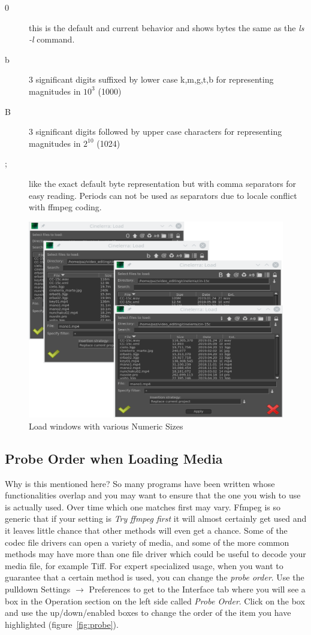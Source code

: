 \begin{description}
    \item[0] this is the default and current behavior and shows bytes the same as the \textit{ls -l} command.
    \item[b] 3 significant digits suffixed by lower case k,m,g,t,b for representing magnitudes in $10^3$ (1000)
    \item[B] 3 significant digits followed by upper case characters for representing magnitudes in $2^{10}$ (1024)
    \item[;] like the exact default byte representation but with comma separators for easy reading.  Periods can
    not be used as separators due to locale conflict with ffmpeg coding.
\end{description}

\begin{figure}[htpb]
    \centering
    \includegraphics[width=0.9\linewidth]{images/load-size.png}
    \caption{Load windows with various Numeric Sizes}
    \label{fig:load-size}
\end{figure}

\subsection{Probe Order when Loading Media}%
\label{sub:probe_order_loading_media}

Why is this mentioned here?  So many programs have been written whose functionalities overlap and you may want to ensure that the one you wish to use is actually used.  Over time which one matches first may vary.  Ffmpeg is so generic that if your setting is \textit{Try ffmpeg first} it will almost certainly get used and it leaves little chance that other methods will even get a chance.  Some of the codec file drivers can open a variety of media, and some of the more common methods may have more than one file driver which could be useful to decode your media file, for example Tiff.  For expert specialized usage, when you want to guarantee that a certain method is used, you can change the \textit{probe order}.  Use the pulldown Settings $\rightarrow$ Preferences to get to the Interface tab where you will see a box in the Operation section on the left side called \textit{Probe Order}.  Click on the box and use the up/down/enabled boxes to change the order of the item you have highlighted (figure~\ref{fig:probe}).

